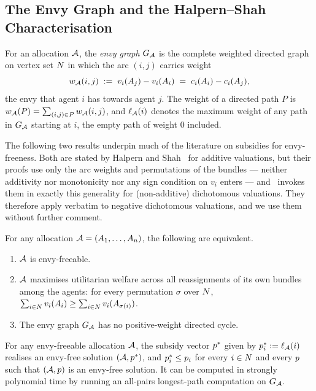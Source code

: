 \subsection{The Envy Graph and the Halpern--Shah Characterisation}
\label{sec:envygraph}

For an allocation $\mathcal{A}$, the \emph{envy graph} $G_{\mathcal{A}}$ is the
complete weighted directed graph on vertex set $N$ in which the arc
$(i,j)$ carries weight
\[
  w_{\mathcal{A}}(i,j) \;:=\; v_i(A_{j}) - v_i(A_{i})
  \;=\; c_i(A_{i}) - c_i(A_{j}),
\]
the envy that agent $i$ has towards agent $j$. The weight of a directed path
$P$ is $w_{\mathcal{A}}(P) = \sum_{(i,j) \in P} w_{\mathcal{A}}(i,j)$, and
$\ell_{\mathcal{A}}(i)$ denotes the maximum weight of any path in
$G_{\mathcal{A}}$ starting at $i$, the empty path of weight $0$ included.

The following two results underpin much of the literature on subsidies for envy-freeness. Both are stated
by Halpern and Shah~\cite{HS19} for additive valuations, but their proofs use
only the arc weights and permutations of the bundles --- neither additivity nor
monotonicity nor any sign condition on $v_i$ enters --- and~\cite{BKNS22} invokes
them in exactly this generality for (non-additive) dichotomous valuations. They
therefore apply verbatim to negative dichotomous valuations, and we use them
without further comment.

\begin{theorem}[\cite{HS19}]
\label{thm:hs-characterisation}
For any allocation $\mathcal{A} = (A_{1},\dots,A_{n})$, the following are
equivalent.
\begin{enumerate}
  \item[(i)] $\mathcal{A}$ is envy-freeable.
  \item[(ii)] $\mathcal{A}$ maximises utilitarian welfare across all reassignments of
    its own bundles among the agents: for every permutation $\sigma$ over
    $N$, $\sum_{i \in N} v_i(A_{i}) \ge
    \sum_{i \in N} v_i(A_{\sigma(i)})$.
  \item[(iii)] The envy graph $G_{\mathcal{A}}$ has no positive-weight
    directed cycle.
\end{enumerate}
\end{theorem}

\begin{theorem}[\cite{HS19}]
\label{thm:hs-minsubsidy}
For any envy-freeable allocation $\mathcal{A}$, the subsidy vector $p^{*}$
given by $p^{*}_i := \ell_{\mathcal{A}}(i)$ realises an envy-free solution
$(\mathcal{A}, p^{*})$, and $p^{*}_i \le p_i$ for every
$i \in N$ and every $p$ such that $(\mathcal{A},p)$ is an
envy-free solution. It can be computed in strongly polynomial time by running
an all-pairs longest-path computation on $G_{\mathcal{A}}$.
\end{theorem}

